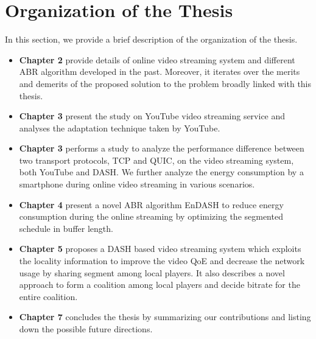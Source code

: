 \section{Organization of the Thesis}

In this section, we provide a brief description of the organization of the thesis.
\begin{itemize}
	\item {\bf Chapter 2} provide details of online video streaming system and different ABR algorithm developed in the past. Moreover, it iterates over the merits and demerits of the proposed solution to the problem broadly linked with this thesis.
	\item {\bf Chapter 3} present the study on YouTube video streaming service and analyses the adaptation technique taken by YouTube.
	\item {\bf Chapter 3} performs a study to analyze the performance difference between two transport protocols, TCP and QUIC, on the video streaming system, both YouTube and DASH. We further analyze the energy consumption by a smartphone during online video streaming in various scenarios.
	\item {\bf Chapter 4} present a novel ABR algorithm EnDASH to reduce energy consumption during the online streaming by optimizing the segmented schedule in buffer length.
	\item {\bf Chapter 5} proposes a DASH based video streaming system which exploits the locality information to improve the video QoE and decrease the network usage by sharing segment among local players. It also describes a novel approach to form a coalition among local players and decide bitrate for the entire coalition.
	\item {\bf Chapter 7} concludes the thesis by summarizing our contributions and listing down the possible future directions.
\end{itemize}